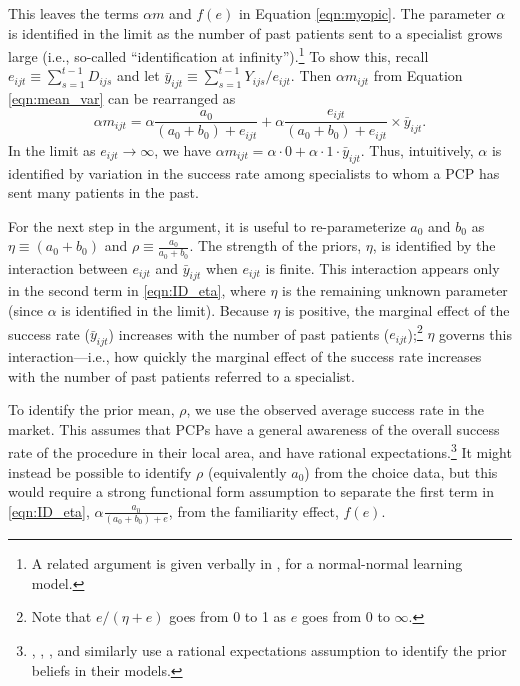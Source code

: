 \documentclass[12pt]{article}
\begin{document}

This leaves the terms $\alpha m$ and $f(e)$ in Equation \eqref{eqn:myopic}. The parameter $\alpha$ is identified in the limit as the number of past patients sent to a specialist grows large (i.e., so-called ``identification at infinity'').\footnote{A related argument is given verbally in \cite{ching2013}, for a normal-normal learning model.} To show this, recall $e_{ijt} \equiv \sum_{s=1}^{t-1} D_{ijs}$ and let $\bar y_{ijt} \equiv \sum_{s=1}^{t-1} Y_{ijs} / e_{ijt}$. Then $\alpha m_{ijt}$ from Equation \eqref{eqn:mean_var} can be rearranged as
\begin{equation}
\alpha m_{ijt} = \alpha \frac{ a_0 }{ (a_0 + b_0) + e_{ijt} }
+ \alpha \frac{ e_{ijt} }{ (a_0 + b_0) + e_{ijt} } \times \bar y_{ijt}.
\label{eqn:ID_eta}
\end{equation}
In the limit as $e_{ijt} \rightarrow \infty$, we have $\alpha m_{ijt} = \alpha \cdot 0 + \alpha \cdot 1 \cdot \bar y_{ijt}$.
Thus, intuitively, $\alpha$ is identified by variation in the success rate among specialists to whom a PCP has sent many patients in the past.

For the next step in the argument, it is useful to re-parameterize $a_0$ and $b_0$ as $\eta \equiv (a_0 + b_0)$ and $\rho \equiv \frac{a_0}{a_0 + b_0}$. The strength of the priors, $\eta$, is identified by the interaction between $e_{ijt}$ and $\bar y_{ijt}$ when $e_{ijt}$ is finite. This interaction appears only in the second term in \eqref{eqn:ID_eta}, where $\eta$ is the remaining unknown parameter (since $\alpha$ is identified in the limit). Because $\eta$ is positive, the marginal effect of the success rate ($\bar y_{ijt}$) increases with the number of past patients ($e_{ijt}$);\footnote{Note that $e / (\eta + e)$ goes from 0 to 1 as $e$ goes from 0 to $\infty$.} $\eta$ governs this interaction---i.e., how quickly the marginal effect of the success rate increases with the number of past patients referred to a specialist.

To identify the prior mean, $\rho$, we use the observed average success rate in the market.  This assumes that PCPs have a general awareness of the overall success rate of the procedure in their local area, and have rational expectations.\footnote{\cite{coscelli2004}, \cite{crawford2005}, \cite{chan2013}, and \cite{dickstein2018} similarly use a rational expectations assumption to identify the prior beliefs in their models.}  It might instead be possible to identify $\rho$ (equivalently $a_0$) from the choice data, but this would require a strong functional form assumption to separate the first term in \eqref{eqn:ID_eta}, $\alpha \frac{ a_0 }{ (a_0 + b_0) + e}$, from the familiarity effect, $f(e)$.
\end{document}
